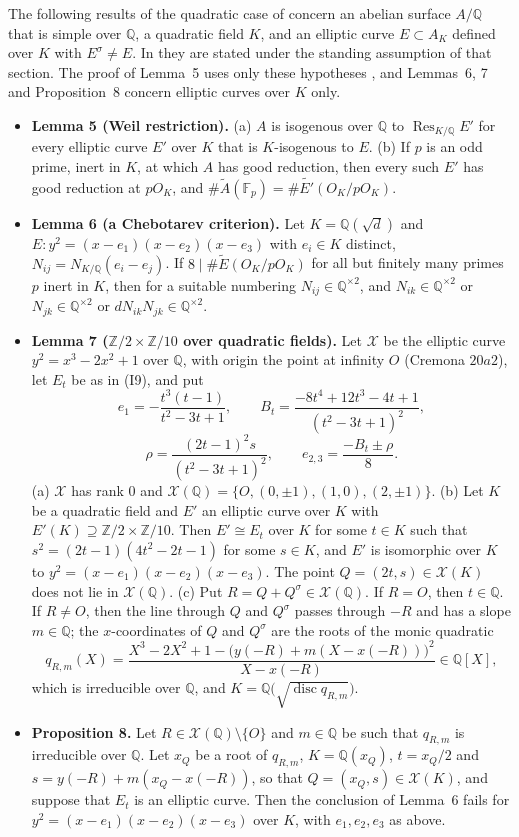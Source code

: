 \documentclass[11pt]{article}
\newcommand{\Q}{\mathbb Q}
\newcommand{\Z}{\mathbb Z}
\newcommand{\F}{\mathbb F}
\DeclareMathOperator{\Res}{Res}
\DeclareMathOperator{\disc}{disc}
\begin{document}
The following results of the quadratic case of \cite[Section~5]{P2210} concern an abelian surface
\(A/\Q\) that is simple over \(\Q\), a quadratic field \(K\), and an elliptic curve \(E\subset A_K\)
defined over \(K\) with \(E^\sigma\neq E\). In \cite{P2210} they are stated under the standing
assumption of that section. The proof of Lemma~5 uses only these hypotheses \cite[Remark~2]{P2210},
and Lemmas~6, 7 and Proposition~8 concern elliptic curves over \(K\) only.
\begin{itemize}
\item \textbf{Lemma 5 (Weil restriction).} (a) \(A\) is isogenous over \(\Q\) to
\(\Res_{K/\Q}E'\) for every elliptic curve \(E'\) over \(K\) that is \(K\)-isogenous to \(E\).
(b) If \(p\) is an odd prime, inert in \(K\), at which \(A\) has good reduction, then every such
\(E'\) has good reduction at \(pO_K\), and \(\#\widetilde A(\F_p)=\#\widetilde{E'}(O_K/pO_K)\).

\item \textbf{Lemma 6 (a Chebotarev criterion).} Let \(K=\Q(\sqrt d)\) and
\(E:y^2=(x-e_1)(x-e_2)(x-e_3)\) with \(e_i\in K\) distinct, \(N_{ij}=N_{K/\Q}(e_i-e_j)\). If
\(8\mid\#\widetilde E(O_K/pO_K)\) for all but finitely many primes \(p\) inert in \(K\), then for a
suitable numbering \(N_{ij}\in\Q^{\times2}\), and \(N_{ik}\in\Q^{\times2}\) or
\(N_{jk}\in\Q^{\times2}\) or \(dN_{ik}N_{jk}\in\Q^{\times2}\).

\item \textbf{Lemma 7 (\(\Z/2\times\Z/10\) over quadratic fields).} Let \(\mathcal X\) be the elliptic
curve \(y^2=x^3-2x^2+1\) over \(\Q\), with origin the point at infinity \(O\) (Cremona \(20a2\)), let
\(E_t\) be as in (I9), and put
\[
e_1=-\frac{t^3(t-1)}{t^2-3t+1},\qquad
B_t=\frac{-8t^4+12t^3-4t+1}{(t^2-3t+1)^2},
\]
\[
\rho=\frac{(2t-1)^2s}{(t^2-3t+1)^2},\qquad
e_{2,3}=\frac{-B_t\pm\rho}{8}.
\]
(a) \(\mathcal X\) has rank \(0\) and \(\mathcal X(\Q)=\{O,(0,\pm1),(1,0),(2,\pm1)\}\). (b) Let \(K\) be a
quadratic field and \(E'\) an elliptic curve over \(K\) with \(E'(K)\supseteq\Z/2\times\Z/10\). Then
\(E'\cong E_t\) over \(K\) for some \(t\in K\) such that \(s^2=(2t-1)(4t^2-2t-1)\) for some \(s\in K\),
and \(E'\) is isomorphic over \(K\) to \(y^2=(x-e_1)(x-e_2)(x-e_3)\). The point \(Q=(2t,s)\in\mathcal X(K)\)
does not lie in \(\mathcal X(\Q)\). (c) Put \(R=Q+Q^\sigma\in\mathcal X(\Q)\). If \(R=O\), then \(t\in\Q\).
If \(R\neq O\), then the line through \(Q\) and \(Q^\sigma\) passes through \(-R\) and has a slope
\(m\in\Q\); the \(x\)-coordinates of \(Q\) and \(Q^\sigma\) are the roots of the monic quadratic
\[q_{R,m}(X)=\frac{X^3-2X^2+1-\bigl(y(-R)+m(X-x(-R))\bigr)^2}{X-x(-R)}\in\Q[X],\]
which is irreducible over \(\Q\), and \(K=\Q\bigl(\sqrt{\disc q_{R,m}}\bigr)\).

\item \textbf{Proposition 8.} Let \(R\in\mathcal X(\Q)\setminus\{O\}\) and \(m\in\Q\) be such that
\(q_{R,m}\) is irreducible over \(\Q\). Let \(x_Q\) be a root of \(q_{R,m}\), \(K=\Q(x_Q)\), \(t=x_Q/2\) and
\(s=y(-R)+m(x_Q-x(-R))\), so that \(Q=(x_Q,s)\in\mathcal X(K)\), and suppose that \(E_t\) is an
elliptic curve. Then the conclusion of Lemma~6 fails for \(y^2=(x-e_1)(x-e_2)(x-e_3)\) over \(K\), with
\(e_1,e_2,e_3\) as above.
\end{itemize}
\end{document}
